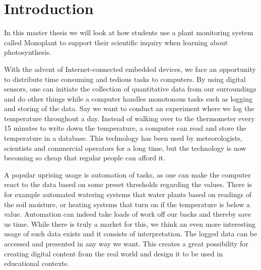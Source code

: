 \setcounter{page}{1}
\chapter{Introduction}
In this master thesis we will look at how students use a plant monitoring system called Monoplant to support their scientific inquiry when learning about photosynthesis. 


With the advent of Internet-connected embedded devices, we face an opportunity to distribute time consuming and tedious tasks to computers. By using digital sensors, one can initiate the collection of quantitative data from our surroundings and do other things while a computer handles monotonous tasks such as logging and storing of the data. Say we want to conduct an experiment where we log the temperature throughout a day. Instead of walking over to the thermometer every 15 minutes to write down the temperature, a computer can read and store the temperature in a database. This technology has been used by meteorologists, scientists and commercial operators for a long time, but the technology is now becoming so cheap that regular people can afford it. %

A popular uprising usage is automation of tasks, as one can make the computer react to the data based on some preset thresholds regarding the values. There is for example automated watering systems that water plants based on readings of the soil moisture, or heating systems that turn on if the temperature is below a value. Automation can indeed take loads of work off our backs and thereby save us time. While there is truly a market for this, we think an even more interesting usage of such data exists and it consists of interpretation. The logged data can be accessed and presented in any way we want. This creates a great possibility for creating digital content from the real world and design it to be used in educational contexts.


